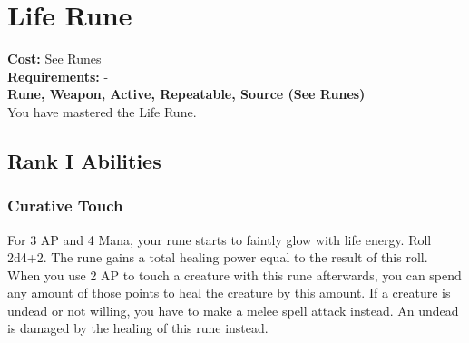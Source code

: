 \section{Life Rune}\label{rune:life}
\textbf{Cost:} See Runes\\
\textbf{Requirements:} -\\
\textbf{Rune, Weapon, Active, Repeatable, Source (See Runes)}\\
You have mastered the Life Rune.

\subsection{Rank I Abilities}

\subsubsection{Curative Touch}
For 3 AP and 4 Mana, your rune starts to faintly glow with life energy.
Roll 2d4+2.
The rune gains a total healing power equal to the result of this roll.
When you use 2 AP to touch a creature with this rune afterwards, you can spend any amount of those points to heal the creature by this amount.
If a creature is undead or not willing, you have to make a melee spell attack instead.
An undead is damaged by the healing of this rune instead.